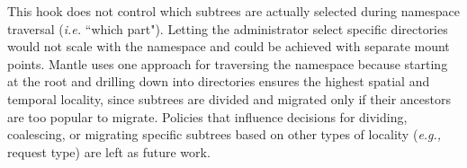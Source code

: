 This hook does not control which subtrees are actually selected during namespace traversal ({\it i.e.} ``which part"). Letting the administrator select specific directories would not scale with the namespace and could be achieved with separate mount points. Mantle uses one approach for traversing the namespace because starting at the root and drilling down into directories ensures the highest spatial and temporal locality, since subtrees are divided and migrated only if their ancestors are too popular to migrate. Policies that influence decisions for dividing, coalescing, or migrating specific subtrees based on other types of locality ({\it e.g.,} request type) are left as future work.


